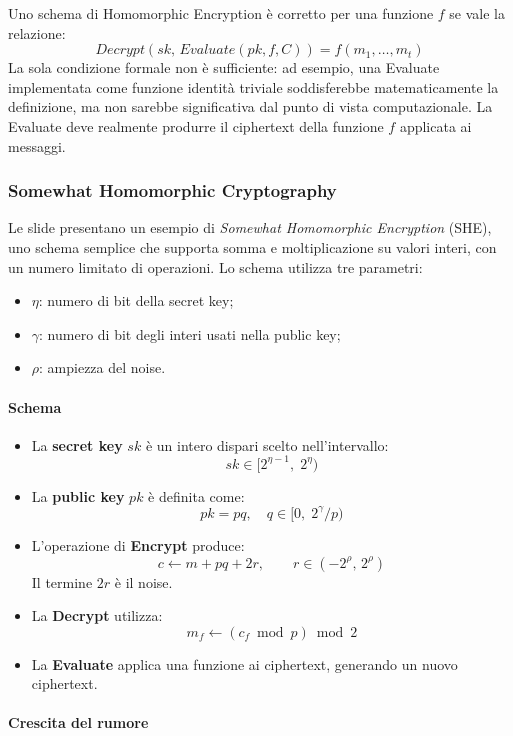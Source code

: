 Uno schema di Homomorphic Encryption è corretto per una funzione $f$ se vale la relazione:
\[
Decrypt(sk,\, Evaluate(pk, f, C)) = f(m_1,\dots,m_t)
\]
La sola condizione formale non è sufficiente: ad esempio, una Evaluate implementata come funzione identità triviale soddisferebbe matematicamente la definizione, ma non sarebbe significativa dal punto di vista computazionale.
La Evaluate deve realmente produrre il ciphertext della funzione $f$ applicata ai messaggi.

\subsubsection{Somewhat Homomorphic Cryptography}

Le slide presentano un esempio di \textit{Somewhat Homomorphic Encryption} (SHE), uno schema semplice che supporta somma e moltiplicazione su valori interi, con un numero limitato di operazioni.
Lo schema utilizza tre parametri:
\begin{itemize}
    \item $\eta$: numero di bit della secret key;
    \item $\gamma$: numero di bit degli interi usati nella public key;
    \item $\rho$: ampiezza del noise.
\end{itemize}

\paragraph{Schema}

\begin{itemize}
    \item La \textbf{secret key} $sk$ è un intero dispari scelto nell'intervallo:
    \[
    sk \in [2^{\eta - 1},\; 2^\eta)
    \]
    \item La \textbf{public key} $pk$ è definita come:
    \[
    pk = p q, \quad q \in [0,\; 2^\gamma/p)
    \]
    \item L’operazione di \textbf{Encrypt} produce:
    \[
    c \leftarrow m + p q + 2 r, \qquad r \in (-2^\rho,\, 2^\rho)
    \]
    Il termine $2r$ è il noise.
    \item La \textbf{Decrypt} utilizza:
    \[
    m_f \leftarrow (c_f \bmod p)\bmod 2
    \]
    \item La \textbf{Evaluate} applica una funzione ai ciphertext, generando un nuovo ciphertext.
\end{itemize}

\paragraph{Crescita del rumore}

